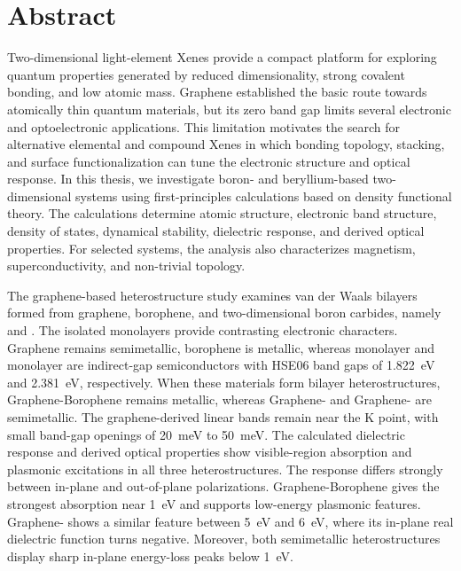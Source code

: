 \chapter*{Abstract}

Two-dimensional light-element Xenes provide a compact platform for exploring quantum properties generated by reduced dimensionality, strong covalent bonding, and low atomic mass.
Graphene established the basic route towards atomically thin quantum materials, but its zero band gap limits several electronic and optoelectronic applications.
This limitation motivates the search for alternative elemental and compound Xenes in which bonding topology, stacking,
and surface functionalization can tune the electronic structure and optical response.
In this thesis, we investigate boron- and beryllium-based two-dimensional systems using first-principles calculations based on density functional theory.
The calculations determine atomic structure, electronic band structure, density of states, dynamical stability, dielectric response, and derived optical properties.
For selected systems, the analysis also characterizes magnetism, superconductivity, and non-trivial topology.

The graphene-based heterostructure study examines van der Waals bilayers formed from graphene, borophene, and two-dimensional boron carbides, namely  and .
The isolated monolayers provide contrasting electronic characters.
Graphene remains semimetallic, borophene is metallic,
whereas monolayer  and monolayer  are indirect-gap semiconductors with HSE06 band gaps of \qty{1.822}{\electronvolt} and \qty{2.381}{\electronvolt}, respectively.
When these materials form bilayer heterostructures, Graphene-Borophene remains metallic, whereas Graphene- and Graphene- are semimetallic.
The graphene-derived linear bands remain near the $\mathrm{K}$ point, with small band-gap openings of \qty{20}{\milli\electronvolt} to \qty{50}{\milli\electronvolt}.
The calculated dielectric response and derived optical properties show visible-region absorption and plasmonic excitations in all three heterostructures.
The response differs strongly between in-plane and out-of-plane polarizations.
Graphene-Borophene gives the strongest absorption near \qty{1}{\electronvolt} and supports low-energy plasmonic features.
Graphene- shows a similar feature between \qty{5}{\electronvolt} and \qty{6}{\electronvolt}, where its in-plane real dielectric function turns negative.
Moreover, both semimetallic heterostructures display sharp in-plane energy-loss peaks below \qty{1}{\electronvolt}.

